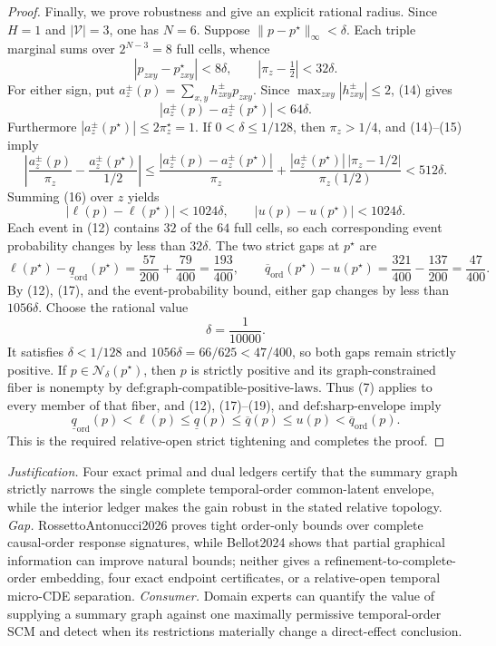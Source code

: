 \documentclass{article}
\begin{document}
\begin{proof}
Finally, we prove robustness and give an explicit rational radius.  Since \(H=1\) and \(|\mathcal V|=3\), one has \(N=6\).  Suppose \(\lVert p-p^{\star}\rVert_{\infty}<\delta\).  Each triple marginal sums over \(2^{N-3}=8\) full cells, whence
\[
|p_{zxy}-p^{\star}_{zxy}|<8\delta,
\qquad
|\pi_z-\tfrac12|<32\delta.
\tag{14}
\]
For either sign, put \(a_z^{\pm}(p)=\sum_{x,y}h^{\pm}_{zxy}p_{zxy}\).  Since \(\max_{zxy}|h^{\pm}_{zxy}|\le2\), (14) gives
\[
|a_z^{\pm}(p)-a_z^{\pm}(p^{\star})|<64\delta.
\tag{15}
\]
Furthermore \(|a_z^{\pm}(p^{\star})|\le 2\pi_z^{\star}=1\).  If \(0<\delta\le1/128\), then \(\pi_z>1/4\), and (14)--(15) imply
\[
\left|
\frac{a_z^{\pm}(p)}{\pi_z}
-\frac{a_z^{\pm}(p^{\star})}{1/2}
\right|
\le
\frac{|a_z^{\pm}(p)-a_z^{\pm}(p^{\star})|}{\pi_z}
+\frac{|a_z^{\pm}(p^{\star})|\,|\pi_z-1/2|}{\pi_z(1/2)}
<512\delta.
\tag{16}
\]
Summing (16) over \(z\) yields
\[
|\ell(p)-\ell(p^{\star})|<1024\delta,
\qquad
|u(p)-u(p^{\star})|<1024\delta.
\tag{17}
\]
Each event in (12) contains \(32\) of the \(64\) full cells, so each corresponding event probability changes by less than \(32\delta\).  The two strict gaps at \(p^{\star}\) are
\[
\ell(p^{\star})-\underline q_{\mathrm{ord}}(p^{\star})
=\frac{57}{200}+\frac{79}{400}=\frac{193}{400},
\qquad
\overline q_{\mathrm{ord}}(p^{\star})-u(p^{\star})
=\frac{321}{400}-\frac{137}{200}=\frac{47}{400}.
\tag{18}
\]
By (12), (17), and the event-probability bound, either gap changes by less than \(1056\delta\).  Choose the rational value
\[
\delta=\frac{1}{10000}.
\tag{19}
\]
It satisfies \(\delta<1/128\) and \(1056\delta=66/625<47/400\), so both gaps remain strictly positive.  If \(p\in\mathcal N_{\delta}(p^{\star})\), then \(p\) is strictly positive and its graph-constrained fiber is nonempty by \(\text{def:graph-compatible-positive-laws}\).  Thus (7) applies to every member of that fiber, and (12), (17)--(19), and \(\text{def:sharp-envelope}\) imply
\[
\underline q_{\mathrm{ord}}(p)<\ell(p)\le\underline q(p)
\le\overline q(p)\le u(p)<\overline q_{\mathrm{ord}}(p).
\tag{20}
\]
This is the required relative-open strict tightening and completes the proof.
\end{proof}
\par\smallskip\noindent \textit{Justification.} Four exact primal and dual ledgers certify that the summary graph strictly narrows the single complete temporal-order common-latent envelope, while the interior ledger makes the gain robust in the stated relative topology. \textit{Gap.} RossettoAntonucci2026 proves tight order-only bounds over complete causal-order response signatures, while Bellot2024 shows that partial graphical information can improve natural bounds; neither gives a refinement-to-complete-order embedding, four exact endpoint certificates, or a relative-open temporal micro-CDE separation. \textit{Consumer.} Domain experts can quantify the value of supplying a summary graph against one maximally permissive temporal-order SCM and detect when its restrictions materially change a direct-effect conclusion.
\end{document}
